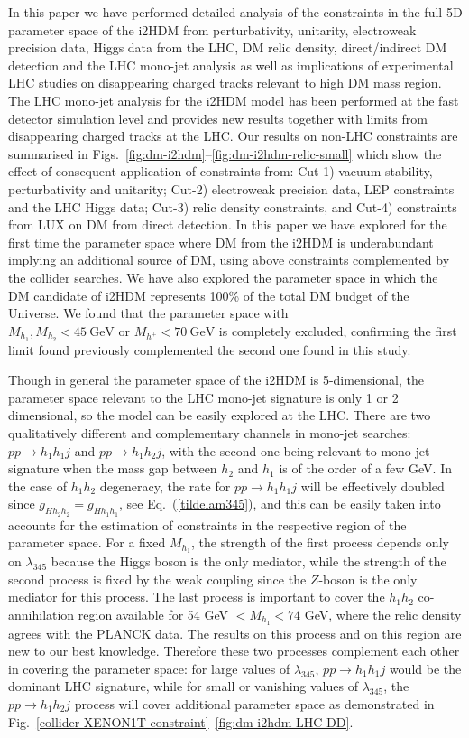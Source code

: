 \documentclass[12pt,a4paper]{article}
\begin{document}
In this paper we have performed 
detailed analysis of the   constraints in the full 5D  parameter space of the i2HDM from perturbativity, unitarity,
electroweak precision data, Higgs data from the LHC,
DM relic density, direct/indirect DM detection and the LHC mono-jet analysis as well as 
implications of experimental LHC studies on disappearing
charged tracks relevant to high DM mass region.
The LHC mono-jet analysis for the i2HDM model has been performed at the fast detector simulation level
and provides new results together with limits from disappearing
charged tracks at the LHC.
Our results on non-LHC constraints are summarised in Figs.~\ref{fig:dm-i2hdm}--\ref{fig:dm-i2hdm-relic-small}
which show the effect of consequent application of constraints
from:  Cut-1) vacuum stability, perturbativity and unitarity;
Cut-2) electroweak precision data, LEP constraints and the LHC Higgs data;
Cut-3) relic density constraints, and  Cut-4) constraints from LUX on DM from direct detection.
In this paper we have explored for the first time 
the parameter space where 
DM from the i2HDM is underabundant implying an additional source of DM,
using above constraints complemented by the  collider searches.
We have also explored  the parameter space in which the DM candidate of i2HDM represents 
100\% of the total DM budget of the Universe.
We found that the parameter space with  
$M_{h_1},M_{h_2}<45~\mbox{GeV} 
\mbox{\ or\ } M_{h^+}<70~\mbox{GeV}$
is completely excluded, confirming the first limit found previously
complemented the second one found in this study.

Though in general the parameter space of the i2HDM is 5-dimensional,
the parameter space relevant to the LHC mono-jet signature is only 1 or 2 dimensional,
so the model can be easily explored at the LHC.
There are two qualitatively different and complementary channels in mono-jet searches:
$pp\to h_1 h_1j$ and $pp\to h_1 h_2 j$,
with the second one being relevant to mono-jet signature
when the mass gap between $h_2$ and $h_1$
is of the order of a few GeV.
In the case of $h_1 h_2$ degeneracy, the rate for $pp\to h_1 h_1j$
will be effectively doubled since $g_{Hh_2 h_2} = g_{Hh_1h_1}$, see Eq.~(\ref{tildelam345}),
and this can be easily taken into accounts for the estimation of constraints
in the respective region of the parameter space.
For a fixed $M_{h_1}$, the strength of the first  process 
depends only on $\lambda_{345}$ because the Higgs boson is the only mediator,
while the  strength of the second  process 
is fixed by the weak coupling since the $Z$-boson is the  only mediator
for this process.
The last process is important to cover the $h_1 h_2$ co-annihilation region
available for 54 GeV $< M_{h_1} <74$ GeV,
where the relic density agrees with the PLANCK data.
The results on this process and on this region are new to our best knowledge.
Therefore these two processes complement each other in covering the parameter space:
for large values of $\lambda_{345}$, $pp\to h_1 h_1j$ would be the dominant LHC
signature, while for small or vanishing values of $\lambda_{345}$, the
$pp\to h_1 h_2 j$ process will cover additional parameter space
as demonstrated in Fig.~\ref{collider-XENON1T-constraint}--\ref{fig:dm-i2hdm-LHC-DD}.
\end{document}
